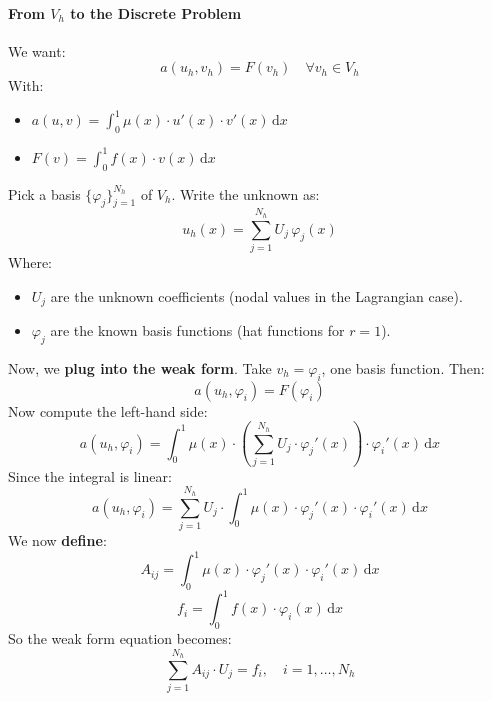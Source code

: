 \paragraph[From V\texorpdfstring{$_h$}{\_h} to the Discrete Problem]{From $V_{h}$ to the Discrete Problem}

We want:
\begin{equation*}
    a(u_h, v_h) = F(v_h) \quad \forall v_h \in V_h
\end{equation*}
With:
\begin{itemize}
    \item $a(u,v) = \displaystyle\int_{0}^{1} \mu(x) \cdot u'(x) \cdot v'(x)\, \mathrm{d}x$
    \item $F(v) = \displaystyle\int_{0}^{1} f(x) \cdot v(x)\, \mathrm{d}x$
\end{itemize}
Pick a basis $\{\varphi_j\}_{j=1}^{N_h}$ of $V_h$. Write the unknown as:
\begin{equation}
    u_h(x) = \sum_{j=1}^{N_h} U_j \, \varphi_j(x)
\end{equation}
Where:
\begin{itemize}
    \item $U_j$ are the unknown coefficients (nodal values in the Lagrangian case).
    \item $\varphi_j$ are the known basis functions (hat functions for $r=1$).
\end{itemize}

\highspace
Now, we \textbf{plug into the weak form}. Take $v_h = \varphi_i$, one basis function. Then:
\begin{equation*}
    a(u_h, \varphi_i) = F(\varphi_i)
\end{equation*}
Now compute the left-hand side:
\begin{equation*}
    a(u_h, \varphi_i) = \int_0^1 \mu(x) \cdot \left(\sum_{j=1}^{N_h} U_j \cdot \varphi_j'(x)\right) \cdot \varphi_i'(x)\, \mathrm{d}x
\end{equation*}
Since the integral is linear:
\begin{equation*}
    a(u_h, \varphi_i) = \sum_{j=1}^{N_h} U_j \cdot \int_0^1 \mu(x) \cdot \varphi_j'(x) \cdot \varphi_i'(x)\, \mathrm{d}x
\end{equation*}
We now \textbf{define}:
\begin{equation}
    A_{ij} = \int_0^1 \mu(x) \cdot \varphi_j'(x) \cdot \varphi_i'(x)\, \mathrm{d}x
\end{equation}
\begin{equation}
    f_i = \int_0^1 f(x) \cdot \varphi_i(x)\, \mathrm{d}x
\end{equation}
So the weak form equation becomes:
\begin{equation}
    \sum_{j=1}^{N_h} A_{ij} \cdot U_j = f_i, \quad i=1,\dots,N_h
\end{equation}

